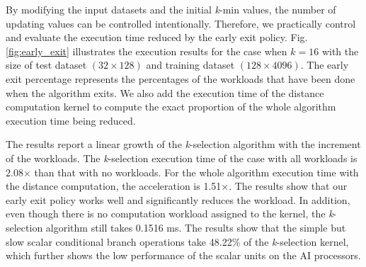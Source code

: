 \begin{figure}[htbp]
\end{figure}

By modifying the input datasets and the initial \textit{k}-min values, the number of updating values can be controlled intentionally. Therefore, we practically control and evaluate the execution time reduced by the early exit policy. Fig. \ref{fig:early_exit} illustrates the execution results for the case when $k = 16$ with the size of test dataset $(32 \times 128)$ and training dataset $(128 \times 4096)$. The early exit percentage represents the percentages of the workloads that have been done when the algorithm exits. We also add the execution time of the distance computation kernel to compute the exact proportion of the whole algorithm execution time being reduced.

The results report a linear growth of the \textit{k}-selection algorithm with the increment of the workloads. The \textit{k}-selection execution time of the case with all workloads is 2.08$\times$ than that with no workloads. For the whole algorithm execution time with the distance computation, the acceleration is 1.51$\times$. The results show that our early exit policy works well and significantly reduces the workload. In addition, even though there is no computation workload assigned to the kernel, the \textit{k}-selection algorithm still takes 0.1516 ms. The results show that the simple but slow scalar conditional branch operations take 48.22\% of the \textit{k}-selection kernel, which further shows the low performance of the scalar units on the AI processors.

